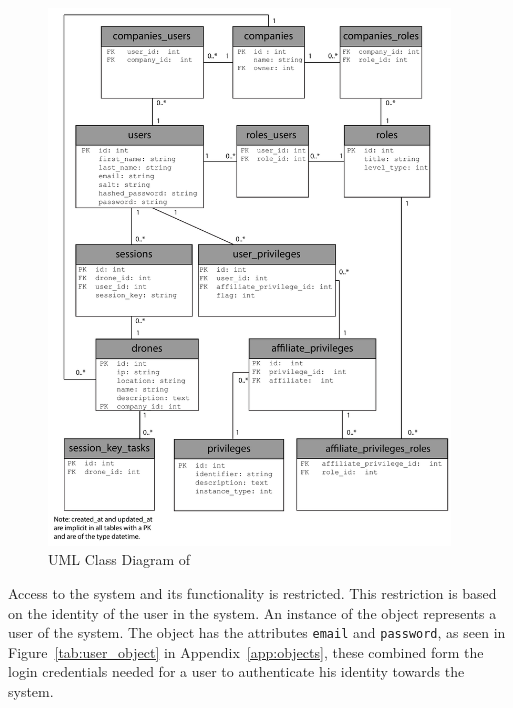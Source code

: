 \begin{figure}[htb]
    \centering
    \includegraphics[width=0.95\textwidth]{gfx/UML_model.pdf}
    \caption{UML Class Diagram of \projectname{}}
    \label{fig:UML_class_diagram}
\end{figure}


Access to the system and its functionality is restricted.
This restriction is based on the identity of the user in the system.
An instance of the  object represents a user of the system.
The  object has the attributes \verb+email+ and \verb+password+, as seen in Figure~\ref{tab:user_object} in Appendix~\ref{app:objects}, these combined form the login credentials needed for a user to authenticate his identity towards the system. \\

